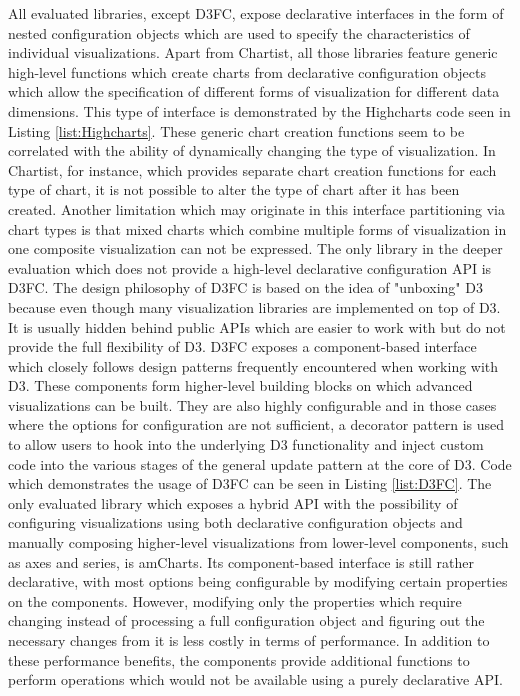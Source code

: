 All evaluated libraries, except D3FC, expose declarative interfaces in the form of nested configuration objects which are used to specify the characteristics of individual visualizations.
Apart from Chartist, all those libraries feature generic high-level functions which create charts from declarative configuration objects which allow the specification of different forms of visualization for different data dimensions.
This type of interface is demonstrated by the Highcharts code seen in Listing \ref{list:Highcharts}.
These generic chart creation functions seem to be correlated with the ability of dynamically changing the type of visualization.
In Chartist, for instance, which provides separate chart creation functions for each type of chart, it is not possible to alter the type of chart after it has been created.
Another limitation which may originate in this interface partitioning via chart types is that mixed charts which combine multiple forms of visualization in one composite visualization can not be expressed.
The only library in the deeper evaluation which does not provide a high-level declarative configuration API is D3FC.
The design philosophy of D3FC is based on the idea of "unboxing" D3 because even though many visualization libraries are implemented on top of D3.
It is usually hidden behind public APIs which are easier to work with but do not provide the full flexibility of D3.
D3FC exposes a component-based interface which closely follows design patterns frequently encountered when working with D3. 
These components form higher-level building blocks on which advanced visualizations can be built. 
They are also highly configurable and in those cases where the options for configuration are not sufficient, a decorator pattern is used to allow users to hook into the underlying D3 functionality and inject custom code into the various stages of the general update pattern at the core of D3.
Code which demonstrates the usage of D3FC can be seen in Listing \ref{list:D3FC}. 
The only evaluated library which exposes a hybrid API with the possibility of configuring visualizations using both declarative configuration objects and manually composing higher-level visualizations from lower-level components, such as axes and series, is amCharts.
Its component-based interface is still rather declarative, with most options being configurable by modifying certain properties on the components.
However, modifying only the properties which require changing instead of processing a full configuration object and figuring out the necessary changes from it is less costly in terms of performance. 
In addition to these performance benefits, the components provide additional functions to perform operations which would not be available using a purely declarative API.


